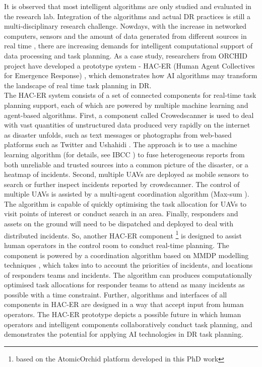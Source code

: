 It is observed that most intelligent algorithms are only studied and evaluated in the research lab. Integration of the algorithms and actual \ac{DR} practices is still a multi-disciplinary research challenge. Nowdays, with the increase in networked computers, sensors and the amount of data generated from different sources in real time \citep{Ramchurn2015}, there are increasing demands for intelligent computational support of data processing and task planning. As a case study, researchers from ORCHID project have developed a prototype system - HAC-ER (Human Agent Collectives for Emergence Response) \citep{Jennings2014,Ramchurn2015,Ramchurn2015a}, which demonstrates how \ac{AI} algorithms may transform the landscape of real time task planning in \ac{DR}.\\

The \ac{HAC-ER} system consists of a set of connected components for real-time task planning support, each of which are powered by multiple machine learning and agent-based algorithms. First, a component called Crowedscanner is used to deal with vast quantities of unstructured data produced very rapidly on the internet as disaster unfolds, such as text messages or photographs from web-based platforms such as Twitter and Ushahidi \citep{Morrow2011}. The approach is to use a machine learning algorithm (for details, see IBCC \citep{Simpson}) to fuse heterogeneous reports from both unreliable and trusted sources into a common picture of the disaster, or a heatmap of incidents. Second, multiple  \acf{UAV}s are deployed as mobile sensors to search or further inspect incidents reported by crowdscanner. The control of multiple \ac{UAV}s is assisted by a multi-agent coordination algorithm (Max-sum \citep{Ramchurn2010}). The algorithm is capable of quickly optimising the task allocation for \ac{UAV}s to visit points of interest or conduct search in an area.  Finally, responders and assets on the ground will need to be dispatched and deployed to deal with distributed incidents. So, another \ac{HAC-ER} component \footnote{based on the AtomicOrchid platform developed in this PhD work} is designed to assist human operators in the control room to conduct real-time planning. The component is powered by a coordination algorithm based on MMDP modelling techniques \citep{Wu2015}, which takes into to account the priorities of incidents, and locations of responders teams and incidents. The algorithm can produces computationally optimised task allocations for responder teams to attend as many incidents as possible with a time constraint. Further, algorithms and interfaces of all components in \ac{HAC-ER} are designed in a way that accept input from human operators. The \ac{HAC-ER} prototype depicts a possible future in which human operators and intelligent components collaboratively conduct task planning, and demonstrates the potential for applying \ac{AI} technologies in \ac{DR} task planning.\\

